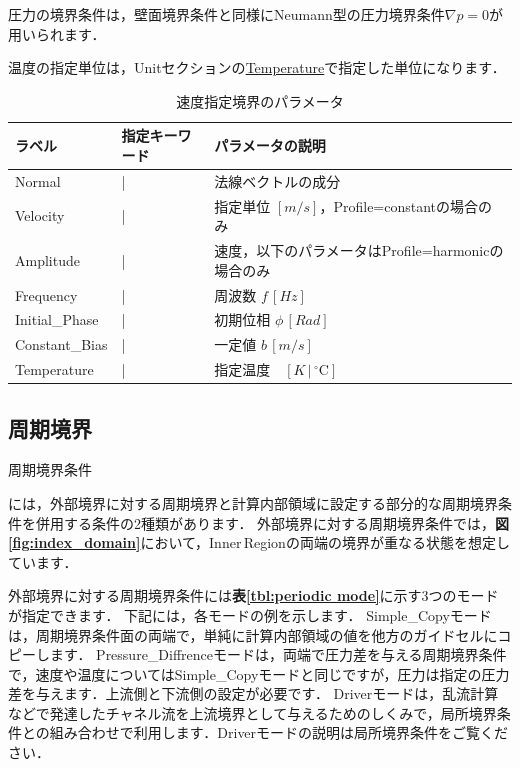 圧力の境界条件は，壁面境界条件と同様にNeumann型の圧力境界条件$\nabla p=0$が用いられます．

温度の指定単位は，Unitセクションの\hyperlink{tgt:unit}{Temperature}で指定した単位になります．

\begin{table}[htdp]
\caption{速度指定境界のパラメータ}
\begin{center}
\small
\begin{tabular}{lll} \toprule
ラベル & 指定キーワード & パラメータの説明\\ \midrule
Normal & | & 法線ベクトルの成分\\
Velocity & | & 指定単位 $[m/s]$，Profile=constantの場合のみ\\
Amplitude & | & 速度，以下のパラメータはProfile=harmonicの場合のみ\\
Frequency & | & 周波数 $f\, [Hz]$\\
Initial\_Phase & | & 初期位相 $\phi\, [Rad]$\\
Constant\_Bias & | & 一定値 $b\, [m/s]$\\
Temperature & | & 指定温度　$[K\,|\,{}^\circ\mathrm{C}]$\\
\bottomrule
\end{tabular}
\end{center}
\label{tbl:vspec parameter with heat}
\end{table}


\pagebreak
\subsection{周期境界}

\hypertarget{tgt:preriodic}{周期境界条件}には，外部境界に対する周期境界と計算内部領域に設定する部分的な周期境界条件を併用する条件の2種類があります．
外部境界に対する周期境界条件では，\textbf{図\ref{fig:index_domain}}において，Inner\,Regionの両端の境界が重なる状態を想定しています．

\vspace{2mm}

外部境界に対する周期境界条件には\textbf{表\ref{tbl:periodic mode}}に示す3つのモードが指定できます．
下記には，各モードの例を示します．
Simple\_Copyモードは，周期境界条件面の両端で，単純に計算内部領域の値を他方のガイドセルにコピーします．
Pressure\_Diffrenceモードは，両端で圧力差を与える周期境界条件で，速度や温度についてはSimple\_Copyモードと同じですが，圧力は指定の圧力差を与えます．上流側と下流側の設定が必要です．
Driverモードは，乱流計算などで発達したチャネル流を上流境界として与えるためのしくみで，局所境界条件との組み合わせで利用します．Driverモードの説明は局所境界条件をご覧ください．

